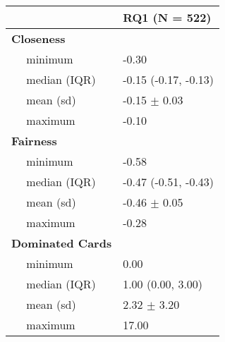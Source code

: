 
\begin{tabular}{l|l}
\hline
 & RQ1 (N = 522)\\
\hline
\bf{Closeness} & ~\\
\hline
~~ minimum & -0.30\\
\hline
~~ median (IQR) & -0.15 (-0.17, -0.13)\\
\hline
~~ mean (sd) & -0.15 $\pm$ 0.03\\
\hline
~~ maximum & -0.10\\
\hline
\bf{Fairness} & ~\\
\hline
~~ minimum & -0.58\\
\hline
~~ median (IQR) & -0.47 (-0.51, -0.43)\\
\hline
~~ mean (sd) & -0.46 $\pm$ 0.05\\
\hline
~~ maximum & -0.28\\
\hline
\bf{Dominated Cards} & ~\\
\hline
~~ minimum & 0.00\\
\hline
~~ median (IQR) & 1.00 (0.00, 3.00)\\
\hline
~~ mean (sd) & 2.32 $\pm$ 3.20\\
\hline
~~ maximum & 17.00\\
\hline
\end{tabular}
